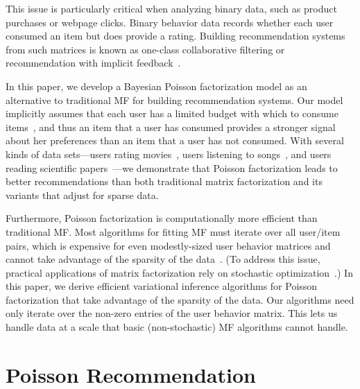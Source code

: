 \documentclass{sig-alternate}
\begin{document}
This issue is particularly critical when analyzing binary data, such
as product purchases or webpage clicks.  Binary behavior data records
whether each user consumed an item but does provide a rating.
Building recommendation systems from such matrices is known as
one-class collaborative filtering or recommendation with implicit
feedback~\cite{Hu:2008p9402,Paquet:2013p9197}.

In this paper, we develop a Bayesian Poisson factorization model as an
alternative to traditional MF for building recommendation systems.
Our model implicitly assumes that each user has a limited budget with
which to consume items~\cite{Goodhardt:1984}, and thus an item that a
user has consumed provides a stronger signal about her preferences
than an item that a user has not consumed.  With several kinds of data
sets---users rating movies~\cite{Herlocker:1999,Koren:2009}, users
listening to songs~\cite{Bertin-Mahieux:2011}, and users reading
scientific papers~\cite{Jack:2010}---we demonstrate that Poisson
factorization leads to better recommendations than both traditional
matrix factorization and its variants that adjust for sparse data.

Furthermore, Poisson factorization is computationally more efficient
than traditional MF.  Most algorithms for fitting MF must iterate over
all user/item pairs, which is expensive for even modestly-sized user
behavior matrices and cannot take advantage of the sparsity of the
data~\cite{Hu:2008p9402}.  (To address this issue, practical applications of matrix
factorization rely on stochastic optimization~\cite{Mairal:2010}.)  In
this paper, we derive efficient variational inference algorithms for
Poisson factorization that take advantage of the sparsity of the
data. Our algorithms need only iterate over the non-zero entries of
the user behavior matrix.  This lets us handle data at a scale that
basic (non-stochastic) MF algorithms cannot handle.




\section{Poisson Recommendation}
\label{sec:model}

\end{document}
